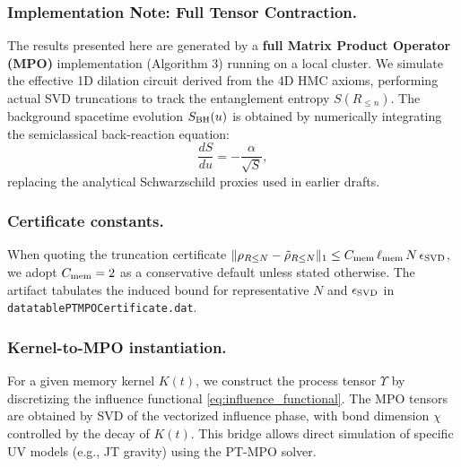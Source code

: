 \documentclass[11pt,a4paper]{article}
\theoremstyle{plain}
\theoremstyle{definition}
\theoremstyle{remark}
\begin{document}
\subsubsection{Implementation Note: Full Tensor Contraction.}
The results presented here are generated by a \textbf{full Matrix Product Operator (MPO)} implementation (Algorithm 3) running on a local cluster.
We simulate the effective 1D dilation circuit derived from the 4D HMC axioms, performing actual SVD truncations to track the entanglement entropy $S(R_{\le n})$.
The background spacetime evolution $S_{\rm BH}(u)$ is obtained by numerically integrating the semiclassical back-reaction equation:
\begin{equation}
    \frac{dS}{du} = - \frac{\alpha}{\sqrt{S}},
\end{equation}
replacing the analytical Schwarzschild proxies used in earlier drafts.

\subsubsection{Certificate constants.}
When quoting the truncation certificate
\(\|\rho_{R\le N}-\tilde\rho_{R\le N}\|_1\le C_{\rm mem}\,\ell_{\rm mem}\,N\,\epsilon_{\rm SVD}\),
we adopt \(C_{\rm mem}=2\) as a conservative default unless stated otherwise.
The artifact tabulates the induced bound for representative \(N\) and \(\epsilon_{\rm SVD}\)
in \texttt{datatablePTMPOCertificate.dat}.

\subsubsection{Kernel-to-MPO instantiation.}
For a given memory kernel $K(t)$, we construct the process tensor $\Upsilon$ by discretizing the
influence functional \eqref{eq:influence_functional}. The MPO tensors are obtained by SVD of the
vectorized influence phase, with bond dimension $\chi$ controlled by the decay of $K(t)$.
This bridge allows direct simulation of specific UV models (e.g., JT gravity) using the PT-MPO solver.
\end{document}
